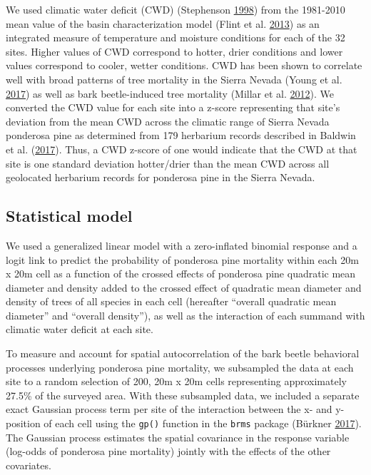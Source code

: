 \documentclass[twoside,12pt,final]{ucthesis-CA2012}
\begin{document}
\begin{ucmainmatter}
We used climatic water deficit (CWD) (Stephenson
\protect\hyperlink{ref-stephenson1998}{1998}) from the 1981-2010 mean
value of the basin characterization model (Flint et al.
\protect\hyperlink{ref-flint2013}{2013}) as an integrated measure of
temperature and moisture conditions for each of the 32 sites. Higher
values of CWD correspond to hotter, drier conditions and lower values
correspond to cooler, wetter conditions. CWD has been shown to correlate
well with broad patterns of tree mortality in the Sierra Nevada (Young
et al. \protect\hyperlink{ref-young2017}{2017}) as well as bark
beetle-induced tree mortality (Millar et al.
\protect\hyperlink{ref-millar2012}{2012}). We converted the CWD value
for each site into a z-score representing that site's deviation from the
mean CWD across the climatic range of Sierra Nevada ponderosa pine as
determined from 179 herbarium records described in Baldwin et al.
(\protect\hyperlink{ref-baldwin2017a}{2017}). Thus, a CWD z-score of one
would indicate that the CWD at that site is one standard deviation
hotter/drier than the mean CWD across all geolocated herbarium records
for ponderosa pine in the Sierra Nevada.

\subsection{Statistical model}\label{statistical-model}

We used a generalized linear model with a zero-inflated binomial
response and a logit link to predict the probability of ponderosa pine
mortality within each 20m x 20m cell as a function of the crossed
effects of ponderosa pine quadratic mean diameter and density added to
the crossed effect of quadratic mean diameter and density of trees of
all species in each cell (hereafter ``overall quadratic mean diameter''
and ``overall density''), as well as the interaction of each summand
with climatic water deficit at each site.

To measure and account for spatial autocorrelation of the bark beetle
behavioral processes underlying ponderosa pine mortality, we subsampled
the data at each site to a random selection of 200, 20m x 20m cells
representing approximately 27.5\% of the surveyed area. With these
subsampled data, we included a separate exact Gaussian process term per
site of the interaction between the x- and y-position of each cell using
the \texttt{gp()} function in the \texttt{brms} package (Bürkner
\protect\hyperlink{ref-burkner2017}{2017}). The Gaussian process
estimates the spatial covariance in the response variable (log-odds of
ponderosa pine mortality) jointly with the effects of the other
covariates.


\end{ucmainmatter}
\end{document}
